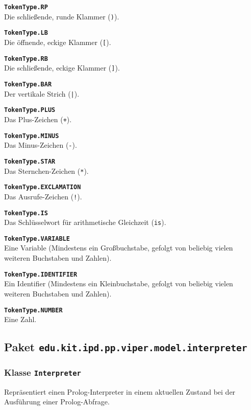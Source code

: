 \documentclass[parskip=full,11pt,twoside]{scrartcl}
\begin{document}
\textbf{\texttt{TokenType.RP}}\\
Die schließende, runde Klammer (\texttt{)}).

\textbf{\texttt{TokenType.LB}}\\
Die öffnende, eckige Klammer (\texttt{[}).

\textbf{\texttt{TokenType.RB}}\\
Die schließende, eckige Klammer (\texttt{]}).

\textbf{\texttt{TokenType.BAR}}\\
Der vertikale Strich (\texttt{|}).

\textbf{\texttt{TokenType.PLUS}}\\
Das Plus-Zeichen (\texttt{+}).

\textbf{\texttt{TokenType.MINUS}}\\
Das Minus-Zeichen (\texttt{-}).

\textbf{\texttt{TokenType.STAR}}\\
Das Sternchen-Zeichen (\texttt{*}).

\textbf{\texttt{TokenType.EXCLAMATION}}\\
Das Ausrufe-Zeichen (\texttt{!}).

\textbf{\texttt{TokenType.IS}}\\
Das Schlüsselwort für arithmetische Gleichzeit (\texttt{is}).

\textbf{\texttt{TokenType.VARIABLE}}\\
Eine Variable (Mindestens ein Großbuchstabe, gefolgt von beliebig vielen weiteren Buchstaben und Zahlen).

\textbf{\texttt{TokenType.IDENTIFIER}}\\
Ein Identifier (Mindestens ein Kleinbuchstabe, gefolgt von beliebig vielen weiteren Buchstaben und Zahlen).

\textbf{\texttt{TokenType.NUMBER}}\\
Eine Zahl.

\newpage
\subsection{Paket \texttt{edu.kit.ipd.pp.viper.model.interpreter}}

\subsubsection{Klasse \texttt{Interpreter}}
Repräsentiert einen Prolog-Interpreter in einem aktuellen Zustand bei der Ausführung einer Prolog-Abfrage.
\end{document}
